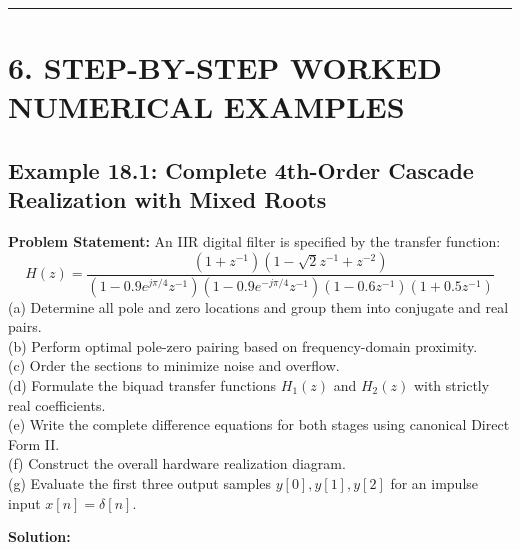 \documentclass[11pt,a4paper]{article}
\begin{document}
\noindent\rule{\textwidth}{0.5pt}

\section{6. STEP-BY-STEP WORKED NUMERICAL EXAMPLES}

\subsection{Example 18.1: Complete 4th-Order Cascade Realization with Mixed Roots}
\textbf{Problem Statement:} An IIR digital filter is specified by the transfer function:
\begin{equation}
H(z) = \frac{(1 + z^{-1})(1 - \sqrt{2} z^{-1} + z^{-2})}{(1 - 0.9 e^{j\pi/4} z^{-1})(1 - 0.9 e^{-j\pi/4} z^{-1})(1 - 0.6 z^{-1})(1 + 0.5 z^{-1})}
\end{equation}
(a) Determine all pole and zero locations and group them into conjugate and real pairs. \\
(b) Perform optimal pole-zero pairing based on frequency-domain proximity. \\
(c) Order the sections to minimize noise and overflow. \\
(d) Formulate the biquad transfer functions $H_1(z)$ and $H_2(z)$ with strictly real coefficients. \\
(e) Write the complete difference equations for both stages using canonical Direct Form II. \\
(f) Construct the overall hardware realization diagram. \\
(g) Evaluate the first three output samples $y[0], y[1], y[2]$ for an impulse input $x[n] = \delta[n]$.

\vspace{0.3cm}
\noindent\textbf{Solution:}
\end{document}
